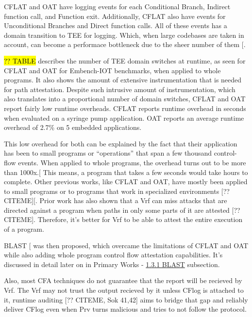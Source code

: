 \documentclass[a4paper, nobind]{templates/ociamthesis}
\begin{document}
CFLAT and OAT have logging events for each Conditional Branch, Indirect function call, and Function exit.
Additionally, CFLAT also have events for Unconditional Branches and Direct function calls.
All of these events has a domain transition to TEE for logging. Which, when large codebases
are taken in account, can become a performace bottleneck due to the sheer number of them {[}\citeproc{ref-blast}{26}{]}.

\hl{?? TABLE} describes the number of TEE domain switches at runtime,
as seen for CFLAT and OAT for Embench-IOT benchmarks, when applied to whole programs.
It also shows the amount of extensive instrumentation that is needed for path attestation.
Despite such intrusive amount of instrumentation, which also translates into
a proportional number of domain switches, CFLAT and OAT report fairly low runtime overheads.
CFLAT reports runtime overhead in seconds when evaluated on a syringe pump application.
OAT reports an average runtime overhead of 2.7\% on 5 embedded applications.

This low overhead for both can be explained by the fact that their application
has been to small programs or ``operations'' that span a few thousand control-flow events.
When applied to whole programs, the overhead turns out to be more than 1000x.{[}\citeproc{ref-blast}{26}{]}
This means, a program that takes a few seconds would take hours to complete.
Other previous works, like CFLAT and OAT, have mostly been applied to small
programs or to programs that work in specialized environments {[}?? CITEME{]}{[}\citeproc{ref-blast}{26}{]}.
Prior work has also shown that a Vrf can miss attacks that are directed against
a program when paths in only some parts of it are attested {[}?? CITEME{]}.
Therefore, it's better for Vrf to be able to attest the entire execution of a program.

BLAST {[}\citeproc{ref-blast}{26}{]} was then proposed, which overcame the limitations of CFLAT and OAT while
also adding whole program control flow attestation capabilities. It's discussed
in detail later on in Primary Works - \hyperref[blast]{1.3.1 BLAST} subsection.

Also, most CFA techniques do not guarantee that the report will be recieved by Vrf.
The Vrf may not trust the output recieved by it unless CFlog is attached to it,
runtime auditing {[}?? CITEME, Sok 41,42{]} aims to bridge that gap and reliably deliver
CFlog even when Prv turns malicious and tries to not follow the protocol.
\end{document}
